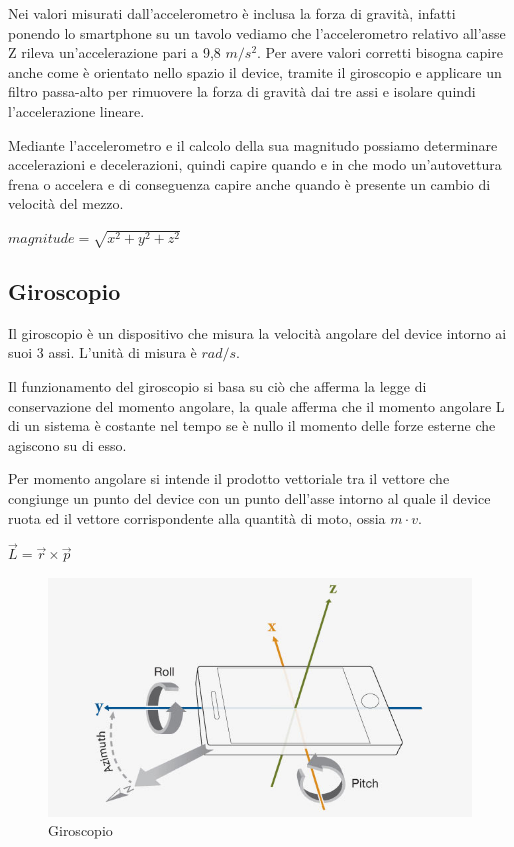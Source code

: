 \documentclass[12pt,a4paper,openright,twoside]{report}
\begin{document}
Nei valori misurati dall'accelerometro è inclusa la forza di gravità, infatti ponendo lo smartphone su un tavolo vediamo che l'accelerometro relativo all'asse Z rileva un'accelerazione pari a 9,8 $m/s^2$.
Per avere valori corretti bisogna capire anche come è orientato nello spazio il device, tramite il giroscopio e applicare un filtro passa-alto per rimuovere la forza di gravità dai tre assi e isolare quindi l'accelerazione lineare.

Mediante l'accelerometro e il calcolo della sua magnitudo possiamo determinare accelerazioni e decelerazioni, quindi capire quando e in che modo un'autovettura frena o accelera e di conseguenza capire anche quando è presente un cambio di velocità del mezzo. \cite{K2, K3, K4, K5, K6, K7}

\begin{center}
$ magnitude = \sqrt{ x^2 + y^2 + z^2}$
\end{center}

\subsection{Giroscopio}
Il giroscopio è un dispositivo che misura la velocità angolare del device intorno ai suoi 3 assi. L'unità di misura è $rad/s$. 

Il funzionamento del giroscopio si basa su ciò che afferma la legge di conservazione del momento angolare, la quale afferma che il momento angolare L di un sistema è costante nel tempo se è nullo il momento delle forze esterne che agiscono su di esso.

Per momento angolare si intende il prodotto vettoriale tra il vettore che congiunge un punto del device con un punto dell'asse intorno al quale il device ruota ed il vettore corrispondente alla quantità di moto, ossia $m \cdot v$.
\begin{center}
$\overrightarrow{L} =  \overrightarrow{r} \times \overrightarrow{p}$
\end{center}

\begin{figure}[h!]
\centering 
\includegraphics[scale=0.6]{fig6} 
\caption{Giroscopio} 
\end{figure}
\end{document}
